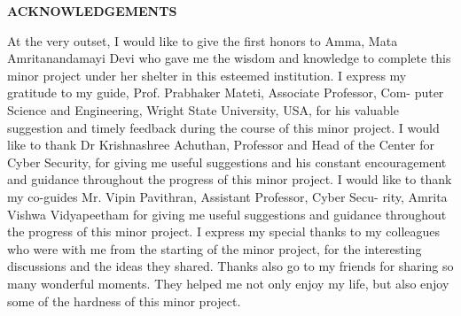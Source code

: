 \newpage
\thispagestyle{plain}

{\centering\bf  ACKNOWLEDGEMENTS\\}\par\vskip 2cm

\singleSpacing
\noindent


\noindent
At the very outset, I would like to give the first honors to Amma, Mata Amritanandamayi
Devi who gave me the wisdom and knowledge to complete this minor project under her shelter
in this esteemed institution.
I express my gratitude to my guide, Prof. Prabhaker Mateti, Associate Professor, Com-
puter Science and Engineering, Wright State University, USA, for his valuable suggestion
and timely feedback during the course of this minor project.
I would like to thank Dr Krishnashree Achuthan, Professor and Head of the Center for
Cyber Security, for giving me useful suggestions and his constant encouragement and guidance
throughout the progress of this minor project.
I would like to thank my co-guides Mr. Vipin Pavithran, Assistant Professor, Cyber Secu-
rity, Amrita Vishwa Vidyapeetham for giving me useful suggestions and guidance throughout
the progress of this minor project.
I express my special thanks to my colleagues who were with me from the starting of the minor
project, for the interesting discussions and the ideas they shared. Thanks also go to my friends for sharing so many wonderful moments. They helped me not only enjoy my life, but also enjoy
some of the hardness of this minor project.

\vfill

\noindent


\doubleSpacing

\newpage




